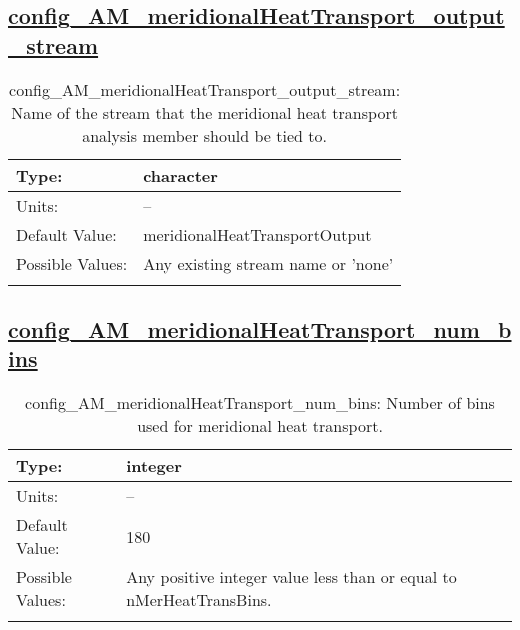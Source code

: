 \subsection[config\_AM\_meridionalHeatTransport\_output\_stream]{\hyperref[sec:nm_tab_AM_meridionalHeatTransport]{config\_AM\_meridionalHeatTransport\_output\_stream}}
\label{subsec:nm_sec_config_AM_meridionalHeatTransport_output_stream}
\begin{center}
\begin{longtable}{| p{2.0in} || p{4.0in} |}
    \hline
    Type: & character \\
    \hline
    Units: & -- \\
    \hline
    Default Value: & meridionalHeatTransportOutput \\
    \hline
    Possible Values: & Any existing stream name or 'none' \\
    \hline
    \caption{config\_AM\_meridionalHeatTransport\_output\_stream: Name of the stream that the meridional heat transport analysis member should be tied to.}
\end{longtable}
\end{center}
\subsection[config\_AM\_meridionalHeatTransport\_num\_bins]{\hyperref[sec:nm_tab_AM_meridionalHeatTransport]{config\_AM\_meridionalHeatTransport\_num\_bins}}
\label{subsec:nm_sec_config_AM_meridionalHeatTransport_num_bins}
\begin{center}
\begin{longtable}{| p{2.0in} || p{4.0in} |}
    \hline
    Type: & integer \\
    \hline
    Units: & -- \\
    \hline
    Default Value: & 180 \\
    \hline
    Possible Values: & Any positive integer value less than or equal to nMerHeatTransBins. \\
    \hline
    \caption{config\_AM\_meridionalHeatTransport\_num\_bins: Number of bins used for meridional heat transport.}
\end{longtable}
\end{center}
